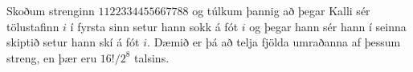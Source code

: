 Skoðum strenginn $1122334455667788$ og túlkum þannig að þegar Kalli sér tölustafinn $i$ í fyrsta sinn setur hann sokk á fót $i$ og þegar hann sér hann í seinna skiptið setur hann skí á fót $i$. Dæmið er þá að telja fjölda umraðanna af þessum streng, en þær eru $16!/2^8$ talsins.